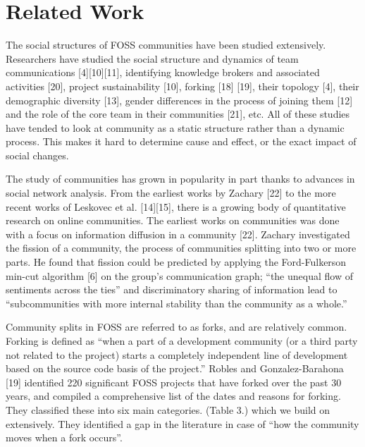 \documentclass[ifip]{svmult}
\begin{document}
\section{Related Work}
\label{sec:2}
The social structures of FOSS communities have been studied extensively. Researchers have studied the social structure and dynamics of team communications [4][10][11], identifying knowledge brokers and associated activities [20], project sustainability [10], forking [18] [19], their topology [4], their demographic diversity [13], gender differences in the process of joining them [12] and the role of the core team in their communities [21], etc. All of these studies have tended to look at community as a static structure rather than a dynamic process. This makes it hard to determine cause and effect, or the exact impact of social changes.

The study of communities has grown in popularity in part thanks to advances in social network analysis.  From the earliest works by Zachary [22] to the more recent works of Leskovec et al. [14][15], there is a growing body of quantitative research on online communities. The earliest works on communities was done with a focus on information diffusion in a community [22].  Zachary investigated the fission of a community, the process of communities splitting into two or more parts. He found that fission could be predicted by applying the Ford-Fulkerson min-cut algorithm [6] on the group's communication graph; ``the unequal flow of sentiments across the ties'' and discriminatory sharing of information lead to ``subcommunities with more internal stability than the community as a whole.'' 

Community splits in FOSS are referred to as forks, and are relatively common. Forking is defined as ``when a part of a development community (or a third party not related to the project) starts a completely independent line of development based on the source code basis of the project.'' Robles and Gonzalez-Barahona [19] identified 220 significant FOSS projects that have forked over the past 30 years, and compiled a comprehensive list of the dates and reasons for forking. They classified these into six main categories. (Table 3.) which we build on extensively. They identified a gap in the literature in case of ``how the community moves when a fork occurs''.
\end{document}
